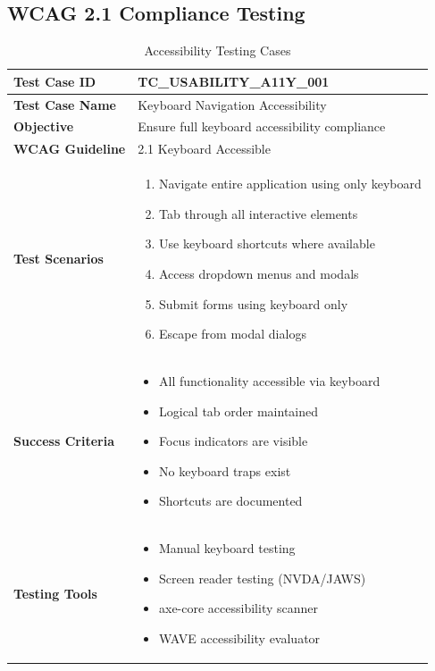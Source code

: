 \documentclass[12pt,a4paper]{article}
\begin{document}
\subsection{WCAG 2.1 Compliance Testing}

\begin{longtable}{|p{3cm}|p{12cm}|}
\caption{Accessibility Testing Cases} \\
\hline
\rowcolor{lightgray}
\textbf{Test Case ID} & \textbf{TC\_USABILITY\_A11Y\_001} \\
\hline
\textbf{Test Case Name} & Keyboard Navigation Accessibility \\
\hline
\textbf{Objective} & Ensure full keyboard accessibility compliance \\
\hline
\textbf{WCAG Guideline} & 2.1 Keyboard Accessible \\
\hline
\textbf{Test Scenarios} & 
\begin{enumerate}[nosep]
    \item Navigate entire application using only keyboard
    \item Tab through all interactive elements
    \item Use keyboard shortcuts where available
    \item Access dropdown menus and modals
    \item Submit forms using keyboard only
    \item Escape from modal dialogs
\end{enumerate} \\
\hline
\textbf{Success Criteria} & 
\begin{itemize}[nosep]
    \item All functionality accessible via keyboard
    \item Logical tab order maintained
    \item Focus indicators are visible
    \item No keyboard traps exist
    \item Shortcuts are documented
\end{itemize} \\
\hline
\textbf{Testing Tools} & 
\begin{itemize}[nosep]
    \item Manual keyboard testing
    \item Screen reader testing (NVDA/JAWS)
    \item axe-core accessibility scanner
    \item WAVE accessibility evaluator
\end{itemize} \\
\hline
\end{longtable}
\end{document}

